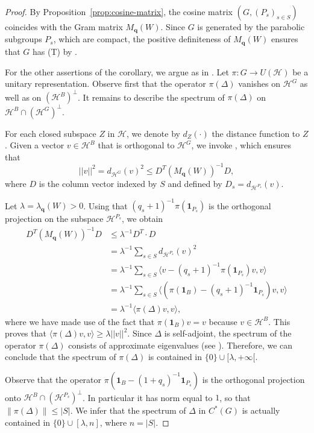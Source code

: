 \documentclass[12pt,a4paper]{amsproc}
\theoremstyle{definition}
\newcommand{\one}{\mathbf 1}
\newcommand{\qq}{\mathbf q}
\begin{document}
\begin{proof}
By Proposition~\ref{prop:cosine-matrix}, the cosine matrix $(G, (P_s)_{s \in S})$ coincides with the Gram matrix $M_\qq(W)$.  Since $G$ is generated by the parabolic subgroups $P_s$, which are compact, the positive definiteness of $M_\qq(W)$ ensures that $G$ has (T) by \cite[\S2]{Ka11}. 

For the other assertions of the corollary, we argue as in \cite[Theorem~6.1]{Ka11}. Let $\pi \colon G \to U(\mathcal{H})$ be a unitary representation. Observe first that the operator $\pi(\Delta)$ vanishes on $\mathcal H^G$ as well as on $(\mathcal H^B)^\perp$. 
It remains to describe the spectrum of $\pi(\Delta) $ on $\mathcal H^B \cap (\mathcal H^G)^\perp$. 

For each closed subspace $Z$ in $\mathcal H$, we denote by $d_Z(\cdot)$ the distance function to $Z$.   Given a vector $v\in \mathcal{H}^B$ that is orthogonal to $\mathcal{H}^G$, we  invoke \cite[Theorem~5.1]{Ka11}, which   ensures that  
$$ ||v||^2 = d_{\mathcal{H}^G}(v)^2 \leq D^T (M_{\textbf{q}}(W))^{-1} D , $$ 
where   $D$ is the column vector indexed by $S$ and defined by $D_s = d_{\mathcal{H}^{P_s}}(v)$. 

Let  $\lambda  = \lambda_\qq(W)> 0$. Using that $(q_s+1)^{-1}\pi(\one_{P_s})$ is the orthogonal projection on the subspace $\mathcal{H}^{P_s}$, we obtain 
\begin{align*}
D^T (M_{\textbf{q}}(W))^{-1} D & \leq \lambda^{-1} D^T \cdot D\\
 & = \lambda^{-1} \sum_{s\in S}d_{\mathcal{H}^{P_s}}(v)^2\\ 
& = \lambda^{-1} \sum_{s\in S}  \langle v - (q_s+1)^{-1}\pi(\one_{P_s}) v , v\rangle \\
& = \lambda^{-1} \sum_{s\in S} \langle (\pi(\one_B) - (q_s+1)^{-1} \one_{P_s}) v , v \rangle \\
&= \lambda^{-1} \langle \pi(\Delta)v,v \rangle, 
\end{align*}
where we have made use of the fact that $\pi(\textbf{1}_B)v = v$ because $v\in \mathcal{H}^B$. This proves that $\langle \pi(\Delta) v,v \rangle \geq \lambda ||v||^2$. Since $\Delta$ is self-adjoint, the spectrum of the operator $\pi(\Delta)$ consists of approximate eigenvalues (see \cite[Ch.~XI, \S1, Ex.~2]{Conway}). Therefore, we can conclude that the spectrum of $\pi(\Delta)$ is contained in $\{0\} \cup [\lambda, +\infty[$. 

Observe that the operator  $ \pi(\one_B - (1+q_s)^{-1} \one_{P_s} )$ is the orthogonal projection onto $\mathcal H^B \cap (\mathcal H^{P_s})^\perp$. In particular it has norm equal to $1$, so that $\|\pi(\Delta)\| \leq  |S|$. We infer that the spectrum of $\Delta$ in $C^*(G)$ is actually contained in $\{0\} \cup [\lambda,n]$, where $n = |S|$. 



\end{proof}
\end{document}
